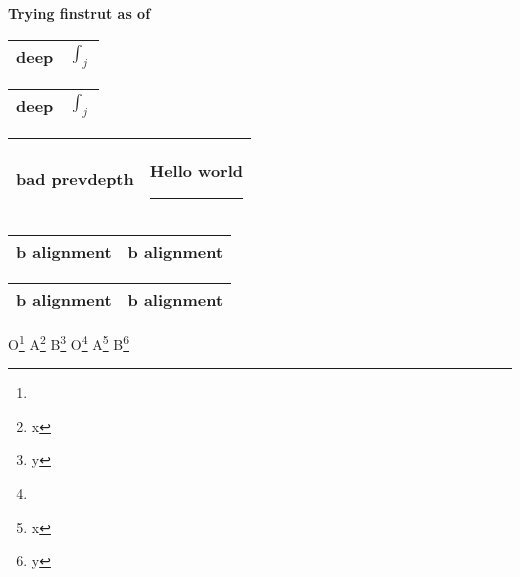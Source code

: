 \documentclass{article}
\def\arraytest{%
          \begin{tabular}{|l|b{2cm}|}\hline
              b alignment & b alignment\par \\\hline
          \end{tabular}
            \nobreak\hfill
          \begin{tabular}{|l|b{2cm}|}\hline
              b alignment & b alignment \\\hline
          \end{tabular}
          \par\medskip\noindent
        }%
\begin{document}
  \begin{center}
    \bfseries 
      Trying \textsf{finstrut} 
       as of 
  \end{center}
\begin{tabular}{|l|p{2cm}|}\hline
    deep & $\displaystyle \int_j$\par \\\hline
\end{tabular}
  \nobreak\hfill
\begin{tabular}{|l|p{2cm}|}\hline
    deep & $\displaystyle \int_j$\\\hline
\end{tabular}
  \par\medskip\noindent\nobreak\hfil
\begin{tabular}{|l|p{2cm}|}\hline
    bad prevdepth & Hello world\hrule \\\hline
\end{tabular}
\nobreak\hfil
  \par\medskip\noindent
\arraytest
O\footnote{\vrule depth22.22pt\par} 
A\footnote{x\par} 
B\footnote{y\par} 
O\footnote{\vrule depth22.22pt}
A\footnote{x} 
B\footnote{y}
\end{document}
